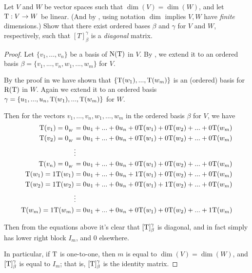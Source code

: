 \begin{exercise} \label{exercise 2.2.17}
Let \(V\) and \(W\) be vector spaces such that \(\dim(V) = \dim(W)\), and let \(\mathrm{T} : V \to W\) be linear.
(And by , using notation \(\dim\) implies \(V, W\) have \emph{finite} dimensions.)
Show that there exist ordered bases \(\beta\) and \(\gamma\) for
\(V\) and \(W\), respectively, such that \([T]_{\beta}^{\gamma}\) is a \emph{diagonal} matrix.
\end{exercise}

\begin{proof}
Let \(\{ v_1, ..., v_n \}\) be a basis of \(\mathrm{N(T)}\) in \(V\).
By , we extend it to an ordered basis \(\beta = \{ v_1, ..., v_n, w_1, ..., w_m \}\) for \(V\).

By the proof in  we have shown that \(\{ \mathrm{T}(w_1), ..., \mathrm{T}(w_m) \}\) is an (ordered) basis for \(\mathrm{R(T)}\) in \(W\).
Again we extend it to an ordered basis \(\gamma = \{ u_1, ..., u_n, \mathrm{T}(w_1), ..., \mathrm{T}(w_m) \}\) for \(W\).

Then for the vectors \(v_1, ..., v_n, w_1, ..., w_m\) in the ordered basis \(\beta\) for \(V\), we have
\begin{align*}
         \mathrm{T}(v_1) = 0_{_W} & = 0 u_1 + ... + 0 u_n + 0 \mathrm{T}(w_1) + 0 \mathrm{T}(w_2) + ... + 0 \mathrm{T}(w_m) \\
         \mathrm{T}(v_2) = 0_{_W} & = 0 u_1 + ... + 0 u_n + 0 \mathrm{T}(w_1) + 0 \mathrm{T}(w_2) + ... + 0 \mathrm{T}(w_m) \\
                       & \vdots \\
         \mathrm{T}(v_n) = 0_{_W} & = 0 u_1 + ... + 0 u_n + 0 \mathrm{T}(w_1) + 0 \mathrm{T}(w_2) + ... + 0 \mathrm{T}(w_m) \\
    \mathrm{T}(w_1) = 1\mathrm{T}(w_1) & = 0 u_1 + ... + 0 u_n + 1 \mathrm{T}(w_1) + 0 \mathrm{T}(w_2) + ... + 0 \mathrm{T}(w_m) \\
    \mathrm{T}(w_2) = 1\mathrm{T}(w_2) & = 0 u_1 + ... + 0 u_n + 0 \mathrm{T}(w_1) + 1 \mathrm{T}(w_2) + ... + 0 \mathrm{T}(w_m) \\
                       & \vdots \\
    \mathrm{T}(w_m) = 1\mathrm{T}(w_m) & = 0 u_1 + ... + 0 u_n + 0 \mathrm{T}(w_1) + 0 \mathrm{T}(w_2) + ... + 1 \mathrm{T}(w_m) \\
\end{align*}

Then from the equations above it's clear that \([\mathrm{T}]_{\beta}^{\gamma}\) is diagonal, and in fact simply has lower right block \(I_m\), and \(0\) elsewhere.

In particular, if \(\mathrm{T}\) is one-to-one, then \(m\) is equal to \(\dim(V) = \dim(W)\), and \([\mathrm{T}]_{\beta}^{\gamma}\) is equal to \(I_m\);
that is, \([\mathrm{T}]_{\beta}^{\gamma}\) is the identity matrix.
\end{proof}

